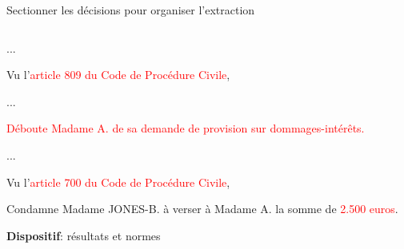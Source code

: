 \documentclass[newPxFont,pagenumber]{beamer}
\begin{document}
\begin{frame}{Sectionner les décisions pour organiser l'extraction}
\begin{columns}
\begin{column}{.55\linewidth}
{\begin{minipage}{\textwidth}
...

Vu l'\textcolor{red}{article 809 du Code de Procédure Civile},

...

\textcolor{red}{Déboute Madame A. de sa demande de provision sur dommages-intérêts.}

...

Vu l'\textcolor{red}{article 700 du Code de Procédure Civile},

Condamne Madame JONES-B. à verser à Madame A. la somme de \textcolor{red}{2.500 euros}.
\end{minipage}}
\vspace{0.1cm}

{\normalsize \textbf{Dispositif}: résultats et normes}

\end{column}
\end{columns}
\end{frame}
\end{document}
